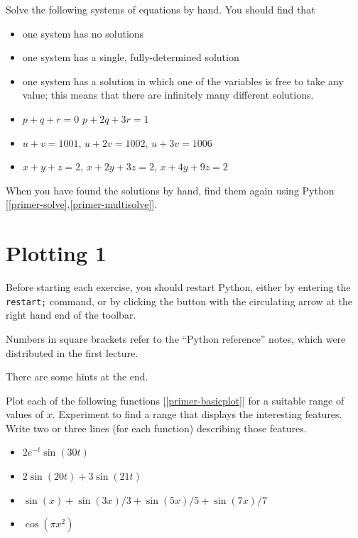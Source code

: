 \documentclass[a4paper,10pt]{amsbook}
\begin{document}
\begin{exercise}\label{ex-linear-trichotomy}
 Solve the following systems of equations by hand.  You should find
 that 
 \begin{itemize}
  \item one system has no solutions
  \item one system has a single, fully-determined solution
  \item one system has a solution in which one of the variables is
   free to take any value; this means that there are infinitely many
   different solutions. 
 \end{itemize}
 \begin{itemize}
  \item[(a)] $p +  q +  r = 0$ \hspace{3em}
             $p + 2q + 3r = 1$
  \item[(b)]
    $u + v  = 1001$,  \hspace{2em} 
    $u + 2v = 1002$,  \hspace{2em} 
    $u + 3v = 1006$
  \item[(c)] 
      $x +  y +  z = 2$,  \hspace{2em} 
      $x + 2y + 3z = 2$,  \hspace{2em} 
      $x + 4y + 9z = 2$
 \end{itemize}
 When you have found the solutions by hand, find them again
 using Python [\ref{primer-solve},\ref{primer-multisolve}].  
\end{exercise}

\chapter{Plotting 1}

Before starting each exercise, you should restart Python, either by
entering the \verb~restart;~ command, or by clicking the button with
the circulating arrow at the right hand end of the toolbar.

Numbers in square brackets refer to the ``Python
reference'' notes, which were distributed in the first lecture.

There are some hints at the end.

\begin{exercise}\label{ex-plot-misc}
 Plot each of the following functions [\ref{primer-basicplot}]
 for a suitable range of values of $x$.  Experiment to find
 a range that displays the interesting features.  Write two
 or three lines (for each function) describing those
 features.
 \begin{itemize}
  \item[(a)] $2e^{-t}\sin(30 t)$ 
  \item[(b)] $2\sin(20 t)+3\sin(21 t)$
  \item[(c)] $\sin(x)+\sin(3x)/3+\sin(5x)/5+\sin(7x)/7$
  \item[(d)] $\cos(\pi x^2)$
 \end{itemize}
\end{exercise}
\end{document}
